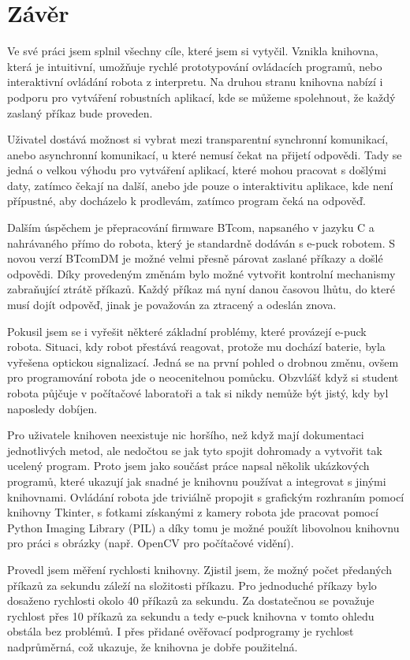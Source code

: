 \chapter*{Závěr}

    Ve své práci jsem splnil všechny cíle, které jsem si vytyčil. Vznikla
    knihovna, která je intuitivní, umožňuje rychlé prototypování ovládacích
    programů, nebo interaktivní ovládání robota z interpretu. Na druhou stranu
    knihovna nabízí i podporu pro vytváření robustních aplikací, kde se můžeme
    spolehnout, že každý zaslaný příkaz bude proveden.

    Uživatel dostává možnost si vybrat mezi transparentní synchronní
    komunikací, anebo asynchronní komunikací, u které nemusí čekat na přijetí
    odpovědi. Tady se jedná o velkou výhodu pro vytváření aplikací, které mohou
    pracovat s došlými daty, zatímco čekají na další, anebo jde pouze o
    interaktivitu aplikace, kde není přípustné, aby docházelo k prodlevám,
    zatímco program čeká na odpověď.

    Dalším úspěchem je přepracování firmware BTcom, napsaného v jazyku C a
    nahrávaného přímo do robota, který je standardně dodáván s e-puck robotem.
    S novou verzí BTcomDM je možné velmi přesně párovat zaslané příkazy a došlé
    odpovědi. Díky provedeným změnám bylo možné vytvořit kontrolní mechanismy
    zabraňující ztrátě příkazů. Každý příkaz má nyní danou časovou lhůtu, do
    které musí dojít odpověď, jinak je považován za ztracený a odeslán znova.

    Pokusil jsem se i vyřešit některé základní problémy, které provázejí e-puck
    robota. Situaci, kdy robot přestává reagovat, protože mu dochází baterie,
    byla vyřešena optickou signalizací. Jedná se na první pohled o drobnou
    změnu, ovšem pro programování robota jde o neocenitelnou pomůcku. Obzvlášť
    když si student robota půjčuje v počítačové laboratoři a tak si nikdy
    nemůže být jistý, kdy byl naposledy dobíjen.

    Pro uživatele knihoven neexistuje nic horšího, než když mají dokumentaci
    jednotlivých metod, ale nedočtou se jak tyto spojit dohromady a vytvořit
    tak ucelený program. Proto jsem jako součást práce napsal několik
    ukázkových programů, které ukazují jak snadné je knihovnu používat a
    integrovat s jinými knihovnami. Ovládání robota jde triviálně propojit s
    grafickým rozhraním pomocí knihovny Tkinter, s fotkami získanými z kamery
    robota jde pracovat pomocí Python Imaging Library (PIL) a díky tomu je
    možné použít libovolnou knihovnu pro práci s obrázky (např. OpenCV pro
    počítačové vidění).

    Provedl jsem měření rychlosti knihovny. Zjistil jsem, že možný
    počet předaných příkazů za sekundu záleží na složitosti příkazu.
    Pro jednoduché příkazy bylo dosaženo rychlosti okolo 40 příkazů za sekundu.
    Za dostatečnou se považuje rychlost přes 10 příkazů za sekundu a tedy
    e-puck knihovna v tomto ohledu obstála bez problémů. I přes přidané
    ověřovací podprogramy je rychlost nadprůměrná, což ukazuje, že knihovna je
    dobře použitelná.

